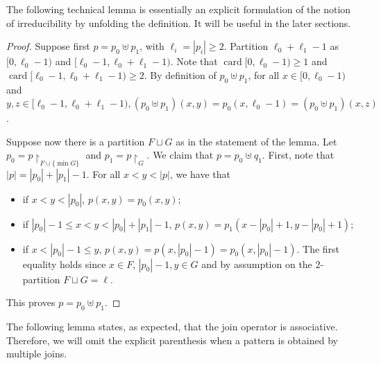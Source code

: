 \documentclass{article}
\newcommand{\uh}{\upharpoonright}
\newcommand{\RT}[0]{\mathsf{RT}}
\newcommand{\card}{\operatorname{card}}
\numberwithin{theorem}{section}
\newtheorem{lemma}[theorem]{Lemma}
\theoremstyle{definition}
\begin{document}
The following technical lemma is essentially an explicit formulation of the notion of irreducibility by unfolding the definition. It will be useful in the later sections. %
\begin{proof}
    Suppose first $p = p_0 \uplus p_1$, with $\ell_i = |p_i| \geq 2$. Partition $\ell_0 + \ell_1-1$ as $[0,\ell_0-1)$ and $[\ell_0-1, \ell_0+\ell_1-1)$. Note that $\card [0,\ell_0-1) \geq 1$ and $\card [\ell_0-1, \ell_0+\ell_1-1) \geq 2$. By definition of $p_0 \uplus p_1$, for all $x \in [0, \ell_0-1)$ and $y,z \in [\ell_0-1, \ell_0 +\ell_1-1), (p_0 \uplus p_1)(x,y) = p_0(x, \ell_0-1) = (p_0 \uplus p_1)(x,z)$.

    Suppose now there is a partition $F \sqcup G$ as in the statement of the lemma. Let $p_0 = p \uh_{F \cup \{\min G\}}$ and $p_1 = p \uh_G$. We claim that $p = p_0 \uplus q_1$. First, note that $|p| = |p_0| + |p_1|-1$. For all $x<y<|p|$, we have that
    \begin{itemize}
        \item if $x<y<|p_0|$, $p(x,y)=p_0(x,y)$;
        \item if $|p_0| - 1 \leq x<y<|p_0|+|p_1|-1$, $p(x,y)=p_1(x-|p_0|+1,y-|p_0|+1)$;
        \item if $x < |p_0|-1 \leq y$, $p(x,y)= p(x,|p_0|-1)=p_0(x,|p_0|-1)$. The first equality holds since $x \in F$, $|p_0|-1, y \in G$ and by assumption on the 2-partition $F \sqcup G = \ell$.
    \end{itemize}
    This proves $p = p_0 \uplus p_1$.
\end{proof}

The following lemma states, as expected, that the join operator is associative. Therefore, we will omit the explicit parenthesis when a pattern is obtained by multiple joins. %
\end{document}
